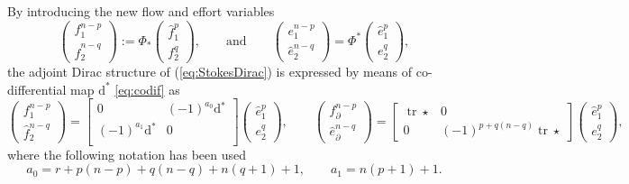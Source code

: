 \documentclass{elsarticle}
\newcommand{\revTwo}[1]{{\color{black}#1}}
\renewcommand\d{\ensuremath{\mathrm{d}}}
\DeclareMathOperator{\tr}{tr}
\newcommand*{\dual}[1]{\ensuremath{\widehat{#1}}}
\begin{document}
By introducing the new flow and effort variables
\begin{equation*}
    \begin{pmatrix}
    f^{n-p}_1 \\
    \dual{f}^{n-q}_2
\end{pmatrix}
 := \Phi_*\begin{pmatrix}
     \dual{f}^p_1\\
     f^q_2
 \end{pmatrix}, \qquad \text{and} \qquad
 \begin{pmatrix}
     e^{n-p}_1\\
     \dual{e}^{n-q}_2
 \end{pmatrix}= \Phi^*
 \begin{pmatrix}
     \dual{e}^{p}_1 \\
     {e}^{q}_2
 \end{pmatrix},
\end{equation*}
\revTwo{the adjoint Dirac structure of (\ref{eq:StokesDirac}) is expressed by means of co-differential map $\d^*$ \eqref{eq:codif} as}
\begin{equation}\label{eq:AdjStokesDirac}
    \begin{pmatrix}
    {f}^{n-p}_1 \\
    \dual{f}^{n-q}_2
    \end{pmatrix} = 
    \begin{bmatrix}
        0 &  (-1)^{a_0}\d{}^* \\
        (-1)^{a_1}\d{}^* & 0 \\
    \end{bmatrix}
    \begin{pmatrix}
        \dual{e}^{p}_1\\
        {e}^{q}_2
    \end{pmatrix}, \qquad 
    \begin{pmatrix}
        {f}_\partial^{n-p} \\
        \dual{e}_\partial^{n-q}
    \end{pmatrix} = 
    \begin{bmatrix}
    \tr \star & 0 \\
    0 &  (-1)^{p+q(n-q)}\tr \star
    \end{bmatrix}
    \begin{pmatrix}
        \dual{e}^{p}_1\\
        {e}^{q}_2
    \end{pmatrix},
\end{equation}
where the following notation has been used
\begin{equation}\label{eq:a_coeff}
    a_0 = r + p(n-p) + q(n-q) + n(q + 1) +1, \qquad a_1 = n(p + 1) + 1.
\end{equation}
\end{document}
